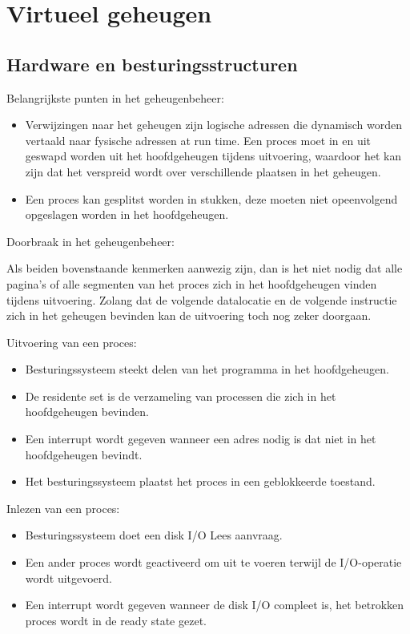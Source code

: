 \section{Virtueel geheugen}

\subsection{Hardware en besturingsstructuren}

Belangrijkste punten in het geheugenbeheer:

\begin{itemize}
\item Verwijzingen naar het geheugen zijn logische adressen die dynamisch worden vertaald naar fysische adressen at run time. Een proces moet in en uit geswapd worden uit het hoofdgeheugen tijdens uitvoering, waardoor het kan zijn dat het verspreid wordt over verschillende plaatsen in het geheugen.
\item Een proces kan gesplitst worden in stukken, deze moeten niet opeenvolgend opgeslagen worden in het hoofdgeheugen.
\end{itemize}

Doorbraak in het geheugenbeheer:

Als beiden bovenstaande kenmerken aanwezig zijn, dan is het niet nodig dat alle pagina’s of alle segmenten van het proces zich in het hoofdgeheugen vinden tijdens uitvoering. Zolang dat de volgende datalocatie en de volgende instructie zich in het geheugen bevinden kan de uitvoering toch nog zeker doorgaan.

Uitvoering van een proces:

\begin{itemize}
\item Besturingssysteem steekt delen van het programma in het hoofdgeheugen.
\item De residente set is de verzameling van processen die zich in het hoofdgeheugen bevinden.
\item Een interrupt wordt gegeven wanneer een adres nodig is dat niet in het hoofdgeheugen bevindt.
\item Het besturingssysteem plaatst het proces in een geblokkeerde toestand. 
\end{itemize}

Inlezen van een proces:
\begin{itemize}
\item Besturingssysteem doet een disk I/O Lees aanvraag.
\item Een ander proces wordt geactiveerd om uit te voeren terwijl de I/O-operatie wordt uitgevoerd.
\item Een interrupt wordt gegeven wanneer de disk I/O compleet is, het betrokken proces wordt in de ready state gezet.
\end{itemize}
	
